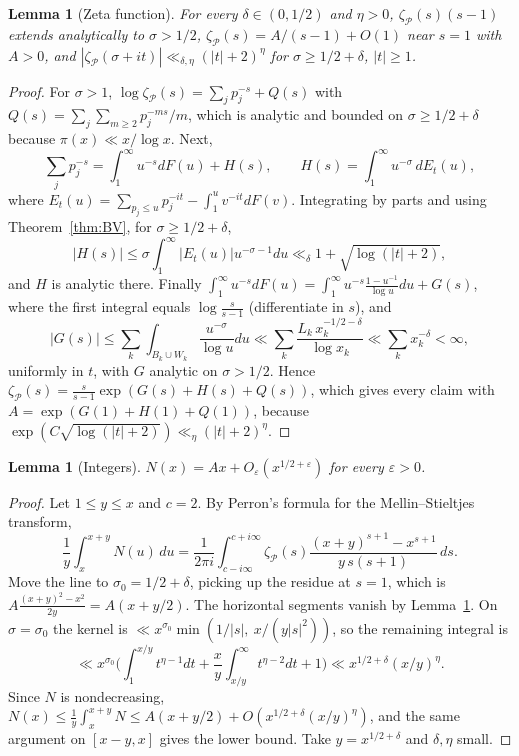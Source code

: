 \documentclass[11pt]{amsart}
\newtheorem{lemma}[theorem]{Lemma}
\theoremstyle{remark}\newtheorem{remark}[theorem]{Remark}
\begin{document}
\begin{lemma}[Zeta function]\label{lem:zeta}
For every $\delta\in(0,1/2)$ and $\eta>0$, $\zeta_{\mathcal P}(s)(s-1)$ extends analytically to $\sigma>1/2$, $\zeta_{\mathcal P}(s)=A/(s-1)+O(1)$ near $s=1$ with $A>0$, and $|\zeta_{\mathcal P}(\sigma+it)|\ll_{\delta,\eta}(|t|+2)^{\eta}$ for $\sigma\ge 1/2+\delta$, $|t|\ge1$.
\end{lemma}
\begin{proof}
For $\sigma>1$, $\log\zeta_{\mathcal P}(s)=\sum_j p_j^{-s}+Q(s)$ with $Q(s)=\sum_j\sum_{m\ge2}p_j^{-ms}/m$, which is analytic and bounded on $\sigma\ge1/2+\delta$ because $\pi(x)\ll x/\log x$. Next,
\[
\sum_j p_j^{-s}=\int_1^\infty u^{-s}dF(u)+H(s),\qquad H(s)=\int_1^\infty u^{-\sigma}\,dE_t(u),
\]
where $E_t(u)=\sum_{p_j\le u}p_j^{-it}-\int_1^uv^{-it}dF(v)$. Integrating by parts and using Theorem~\ref{thm:BV}, for $\sigma\ge1/2+\delta$,
\[
|H(s)|\le\sigma\int_1^\infty|E_t(u)|u^{-\sigma-1}du\ll_\delta 1+\sqrt{\log(|t|+2)},
\]
and $H$ is analytic there. Finally $\int_1^\infty u^{-s}dF(u)=\int_1^\infty u^{-s}\frac{1-u^{-1}}{\log u}du+G(s)$, where the first integral equals $\log\frac{s}{s-1}$ (differentiate in $s$), and
\[
|G(s)|\le\sum_k\int_{B_k\cup W_k}\frac{u^{-\sigma}}{\log u}du\ll\sum_k\frac{L_k\,x_k^{-1/2-\delta}}{\log x_k}\ll\sum_k x_k^{-\delta}<\infty,
\]
uniformly in $t$, with $G$ analytic on $\sigma>1/2$. Hence $\zeta_{\mathcal P}(s)=\frac{s}{s-1}\exp(G(s)+H(s)+Q(s))$, which gives every claim with $A=\exp(G(1)+H(1)+Q(1))$, because $\exp(C\sqrt{\log(|t|+2)})\ll_\eta(|t|+2)^\eta$.
\end{proof}

\begin{lemma}[Integers]\label{lem:N}
$N(x)=Ax+O_\varepsilon(x^{1/2+\varepsilon})$ for every $\varepsilon>0$.
\end{lemma}
\begin{proof}
Let $1\le y\le x$ and $c=2$. By Perron's formula for the Mellin--Stieltjes transform,
\[
\frac1y\int_x^{x+y}N(u)\,du=\frac1{2\pi i}\int_{c-i\infty}^{c+i\infty}\zeta_{\mathcal P}(s)\frac{(x+y)^{s+1}-x^{s+1}}{y\,s(s+1)}\,ds .
\]
Move the line to $\sigma_0=1/2+\delta$, picking up the residue at $s=1$, which is $A\frac{(x+y)^2-x^2}{2y}=A(x+y/2)$. The horizontal segments vanish by Lemma~\ref{lem:zeta}. On $\sigma=\sigma_0$ the kernel is $\ll x^{\sigma_0}\min(1/|s|,\ x/(y|s|^2))$, so the remaining integral is
\[
\ll x^{\sigma_0}\Big(\int_{1}^{x/y}t^{\eta-1}dt+\frac xy\int_{x/y}^\infty t^{\eta-2}dt+1\Big)\ll x^{1/2+\delta}(x/y)^{\eta}.
\]
Since $N$ is nondecreasing, $N(x)\le\frac1y\int_x^{x+y}N\le A(x+y/2)+O(x^{1/2+\delta}(x/y)^\eta)$, and the same argument on $[x-y,x]$ gives the lower bound. Take $y=x^{1/2+\delta}$ and $\delta,\eta$ small.
\end{proof}
\end{document}
